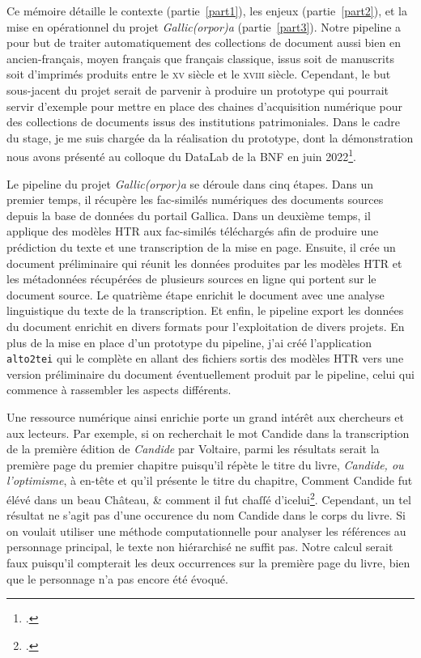 \documentclass[class=article, crop=false]{standalone}
\begin{document}
Ce mémoire détaille le contexte (partie~\ref{part1}), les enjeux (partie~\ref{part2}), et la mise en opérationnel du projet \textit{Gallic(orpor)a} (partie~\ref{part3}). Notre pipeline a pour but de traiter automatiquement des collections de document aussi bien en ancien-français, moyen français que français classique, issus soit de manuscrits soit d’imprimés produits entre le \textsc{xv} siècle et le \textsc{xviii} siècle. Cependant, le but sous-jacent du projet serait de parvenir à produire un prototype qui pourrait servir d’exemple pour mettre en place des chaines d’acquisition numérique pour des collections de documents issus des institutions patrimoniales. Dans le cadre du stage, je me suis chargée da la réalisation du prototype, dont la démonstration nous avons présenté au colloque du DataLab de la \acrshort{BNF} en juin 2022\footcite{christensenGallicOrporTraitment2022}.

Le pipeline du projet \textit{Gallic(orpor)a} se déroule dans cinq étapes. Dans un premier temps, il récupère les fac-similés numériques des documents sources depuis la base de données du portail Gallica. Dans un deuxième temps, il applique des modèles \acrshort{HTR} aux fac-similés téléchargés afin de produire une prédiction du texte et une transcription de la mise en page. Ensuite, il crée un document préliminaire qui réunit les données produites par les modèles \acrshort{HTR} et les métadonnées récupérées de plusieurs sources en ligne qui portent sur le document source. Le quatrième étape enrichit le document avec une analyse linguistique du texte de la transcription. Et enfin, le pipeline export les données du document enrichit en divers formats pour l'exploitation de divers projets. En plus de la mise en place d'un prototype du pipeline, j'ai créé l'application \texttt{alto2tei} qui le complète en allant des fichiers sortis des modèles \acrshort{HTR} vers une version préliminaire du document éventuellement produit par le pipeline, celui qui commence à rassembler les aspects différents.

Une ressource numérique ainsi enrichie porte un grand intérêt aux chercheurs et aux lecteurs. Par exemple, si on recherchait le mot \og{}Candide\fg{} dans la transcription de la première édition de \textit{Candide} par Voltaire, parmi les résultats serait la première page du premier chapitre puisqu'il répète le titre du livre, \textit{Candide, ou l'optimisme}, à en-tête et qu'il présente le titre du chapitre, \og{}Comment Candide fut élévé dans un beau Château, \& comment il fut chaſſé d'icelui\fg{}\footcite[3]{voltaireCandideOuOptimisme1759}. Cependant, un tel résultat ne s'agit pas d'une occurence du nom \og{}Candide\fg{} dans le corps du livre. Si on voulait utiliser une méthode computationnelle pour analyser les références au personnage principal, le texte non hiérarchisé ne suffit pas. Notre calcul serait faux puisqu'il compterait les deux occurrences sur la première page du livre, bien que le personnage n'a pas encore été évoqué.
\end{document}

